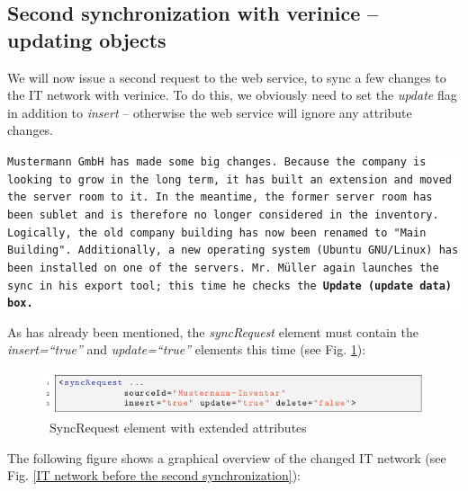 \documentclass[a4paper,10pt]{book}
\begin{document}
\subsection{ Second synchronization with verinice – updating objects}
We will now issue a second request to the web service, to sync a few changes to the IT network with verinice.
To do this, we obviously need to set the \textit{update} flag in addition to \textit{insert} – otherwise the web service will
ignore any attribute changes.
\newline
\newline
\colorbox{white}{\parbox{\textwidth}{
{\tt Mustermann GmbH has made some big changes. Because the company is looking to grow in the long term, it has
built an extension and moved the server room to it. In the meantime, the former server room has been sublet
and is therefore no longer considered in the inventory. Logically, the old company building has now been
renamed to "Main Building". Additionally, a new operating system (Ubuntu GNU/Linux) has been installed on
one of the servers. Mr. Müller again launches the sync in his export tool; this time he checks the \textbf{Update (update data)
box.}}
}}\newline\newline
As has already been mentioned, the \textit{syncRequest} element must contain the \textit{insert=``true''} and \textit{update=``true''} elements this time (see Fig. \ref{SyncRequest element with extended attributes}):
\newline
\begin{figure}[htb!]
  \centering
  \includegraphics[scale=.75]{Screenshot/SyncAPI_Fallstudie_09-en.png}
  \caption{\label{SyncRequest element with extended attributes} \ SyncRequest element with extended attributes}
\end{figure}
\newline
 The following figure shows a graphical overview of the changed IT network (see Fig. \ref{IT network before the second synchronization}):
 \newline
\end{document}
